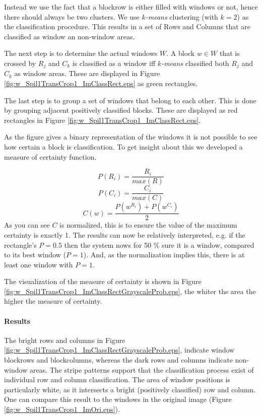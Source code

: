 Instead we use the fact that a blockrow is either filled with windows or not, hence
there should always be two clusters.  We use \emph{$k$-means} clustering (with
$k=2$) as the classification procedure.
This results in a set of Rows and Columns that are classified as window an
non-window areas.

The next step is to determine the actual windows $W$.
A block $w\in W$ that is crossed by $R_j$ and $C_k$ is classified as a
window iff \emph{$k$-means} classified both $R_j$ and $C_k$ as window areas. These are displayed in 
 Figure \ref{fig:w_Spil1TransCrop1_ImClassRect.eps} as green rectangles.

The last step is to group a set of windows that belong to each other. This is done by 
grouping adjacent positively classified blocks. These are displayed as red
rectangles in Figure \ref{fig:w_Spil1TransCrop1_ImClassRect.eps}.

As the figure gives a binary representation of the windows it is not possible
to see how certain a block is classification.
To get insight about this we developed a measure of certainty function.

\[P(R_i) = \frac{R_i}{max(R)}\]
\[P(C_i) = \frac{C_i}{max(C)}\]
\[C(w) = \frac{P(w^{R_i}) + P(w^{C_i})}{2}\]
As you can see $C$ is normalized, this is to ensure the value of the maximum
certainty is exactly 1. The results can now be relatively interpreted, e.g. if the rectangle's $P=0.5$
then the system nows for 50 \% sure it is a window, compared to its best window ($P=1$). 
And, as the normalization implies this, there is at least one window with $P=1$. 

The visualization of the measure of certainty is shown in Figure
\ref{fig:w_Spil1TransCrop1_ImClassRectGrayscaleProb.eps},  
the whiter the area the higher the measure of certainty.



\newpage
\paragraph{Results} %
\clearpage

The bright rows and columns in Figure
\ref{fig:w_Spil1TransCrop1_ImClassRectGrayscaleProb.eps},  indicate window
blockrows and blockcolumns, whereas the dark rows and columns indicate
non-window areas.
The stripe patterns support that the classification process exist of individual
row and column classification.
The area of window positions is particularly white, as it 
intersects a bright (positively classified) row and column.
One can compare this result to the windows in the original image 
(Figure \ref{fig:w_Spil1TransCrop1_ImOri.eps}).

